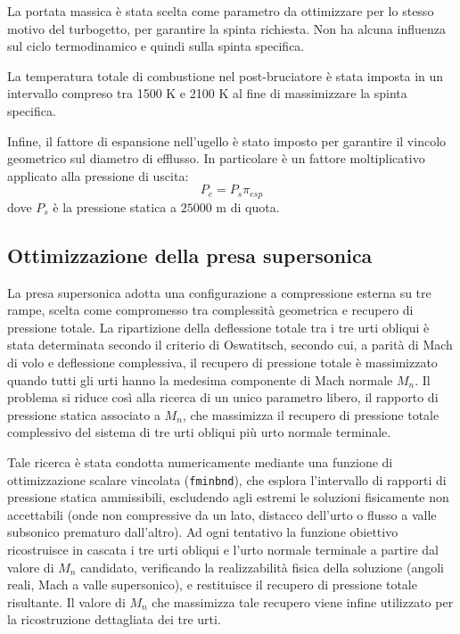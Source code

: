La portata massica è stata scelta come parametro da ottimizzare per lo stesso motivo del turbogetto, per garantire la spinta richiesta. Non ha alcuna influenza sul ciclo termodinamico e quindi sulla spinta specifica.

La temperatura totale di combustione nel post-bruciatore è stata imposta in un intervallo compreso tra 1500 K e 2100 K al fine di massimizzare la spinta specifica. 

Infine, il fattore di espansione nell'ugello è stato imposto per garantire il vincolo geometrico sul diametro di efflusso. In particolare è un fattore moltiplicativo applicato alla pressione di uscita:
\begin{equation*}
    P_{e} = P_s\pi_{esp}
\end{equation*}
dove $P_s$ è la pressione statica a $25000$ m di quota.

\subsection{Ottimizzazione della presa supersonica}
La presa supersonica adotta una configurazione a compressione esterna su tre rampe, scelta come compromesso tra complessità geometrica e recupero di pressione totale. La ripartizione della deflessione totale tra i tre urti obliqui è stata determinata secondo il criterio di Oswatitsch, secondo cui, a parità di Mach di volo e deflessione complessiva, il recupero di pressione totale è massimizzato quando tutti gli urti hanno la medesima componente di Mach normale $M_n$. Il problema si riduce così alla ricerca di un unico parametro libero, il rapporto di pressione statica associato a $M_n$, che massimizza il recupero di pressione totale complessivo del sistema di tre urti obliqui più urto normale terminale. 

Tale ricerca è stata condotta numericamente mediante una funzione di ottimizzazione scalare vincolata (\texttt{fminbnd}), che esplora l'intervallo di rapporti di pressione statica ammissibili, escludendo agli estremi le soluzioni fisicamente non accettabili (onde non compressive da un lato, distacco dell'urto o flusso a valle subsonico prematuro dall'altro). Ad ogni tentativo la funzione obiettivo ricostruisce in cascata i tre urti obliqui e l'urto normale terminale a partire dal valore di $M_n$ candidato, verificando la realizzabilità fisica della soluzione (angoli reali, Mach a valle supersonico), e restituisce il recupero di pressione totale risultante. Il valore di $M_n$ che massimizza tale recupero viene infine utilizzato per la ricostruzione dettagliata dei tre urti.